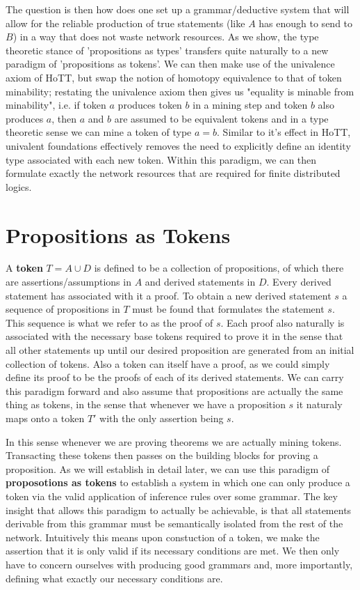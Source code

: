 \documentclass[12pt]{amsart}
\begin{document}
The question is then how does one set up a grammar/deductive system that will allow for the reliable production of true statements (like $A$ has enough to send to $B$) in a way that does not waste network resources. As we show, the type theoretic stance of 'propositions as types' transfers quite naturally to a new paradigm of 'propositions as tokens'. We can then make use of the univalence axiom of HoTT, but swap the notion of homotopy equivalence to that of token minability; restating the univalence axiom then gives us "equality is minable from minability", i.e. if token $a$ produces token $b$ in a mining step and token $b$ also produces $a$, then $a$ and $b$ are assumed to be equivalent tokens and in a type theoretic sense we can mine a token of type $a = b$. Similar to it's effect in HoTT, univalent foundations effectively removes the need to explicitly define an identity type associated with each new token. Within this paradigm, we can then formulate exactly the network resources that are required for finite distributed logics.\newline


\section{Propositions as Tokens}
A \textbf{token} $T = A\cup D$ is defined to be a collection of propositions, of which there are assertions/assumptions in $A$ and derived statements in $D$. Every derived statement has associated with it a proof. To obtain a new derived statement $s$ a sequence of propositions in $T$ must be found that formulates the statement $s$. This sequence is what we refer to as the proof of $s$. Each proof also naturally is associated with the necessary base tokens required to prove it in the sense that all other statements up until our desired proposition are generated from an initial collection of tokens. Also a token can itself have a proof, as we could simply define its proof to be the proofs of each of its derived statements. We can carry this paradigm forward and also assume that propositions are actually the same thing as tokens, in the sense that whenever we have a proposition $s$ it naturaly maps onto a token $T'$ with the only assertion being $s$. \newline

In this sense whenever we are proving theorems we are actually mining tokens. Transacting these tokens then passes on the building blocks for proving a proposition. As we will establish in detail later, we can use this paradigm of \textbf{proposotions as tokens} to establish a system in which one can only produce a token via the valid application of inference rules over some grammar. The key insight that allows this paradigm to actually be achievable, is that all statements derivable from this grammar must be semantically isolated from the rest of the network. Intuitively this means upon constuction of a token, we make the assertion that it is only valid if its necessary conditions are met. We then only have to concern ourselves with producing good grammars and, more importantly, defining what exactly our necessary conditions are.
\end{document}
